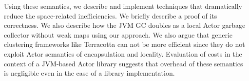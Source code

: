 \begin{comment}

\begin{align*}
&< \mbox{remote\_create : a, a'} > \\
&\quad \cnfg{\alpha, [R[\mbox{create(node)}]]_{a}}{\mu}{\rho}{\chi} \mapsto \cnfg{\alpha, [R[nil]]_{a}}{\mu}{\rho}{\chi \cup \{a'\}}\\
\\
&< \mbox{remote\_init : a, a'} > \\
&\quad \cnfg{\alpha, [R[\mbox{initbeh(a', v)}]]_{a}}{\mu}{\rho}{\chi} \mapsto \cnfg{\alpha, [R[nil]]_{a}}{\mu}{\rho \cup (FV(v) \cap Dom (\alpha))}{\chi}\\
\\
&< \mbox{remote\_create\_request : a, a'} > \\
&\quad \cnfg{\alpha}{\mu}{\rho}{\chi} \mapsto \cnfg{\alpha, (?_a)_{a'}}{\mu}{\rho \cup \{a'\}}{\chi}\\
\\
&< \mbox{remote\_init\_request : a, a'} > \\
&\quad \cnfg{\alpha, (?_a)_{a'}}{\mu}{\rho}{\chi} \mapsto \cnfg{\alpha, (v)_{a'}}{\mu}{\rho}{\chi \cup (FV(v) - Dom (\alpha))}\\
\\
&< \mbox{migrate\_out : a, node} > \\
&\quad \cnfg{\alpha, [R[\mbox{migrate(node)}]]_{a}}{\mu}{\rho}{\chi} \mapsto \cnfg{\alpha}{\mu}{(\rho \cup (FV(a) \cap Dom (\alpha))) - \{a\}}{\chi}\\
\\
&< \mbox{migrate\_in : a} > \\
&\quad \cnfg{\alpha}{\mu}{\rho}{\chi} \mapsto \cnfg{\alpha, [R[nil]]_{a}}{\mu}{\rho \cup \{a\}}{\chi \cup (FV(a) - Dom (\alpha))}
\end{align*}
\end{comment}

Using these semantics, we describe and implement techniques that dramatically reduce the space-related inefficiencies. We briefly describe a proof of its correctness. We also describe how the JVM GC doubles as a local Actor garbage collector without weak maps using our approach. We also argue that generic clustering frameworks like Terracotta can not be more efficient since they do not exploit Actor semantics of encapsulation and locality. Evaluation of costs in the context of a JVM-based Actor library suggests that overhead of these semantics is negligible even in the case of a library implementation. 


